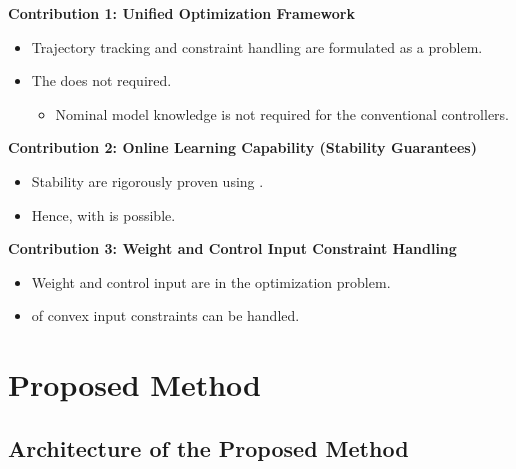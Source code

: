 \documentclass[8pt, aspectratio=169]{beamer}
\newcommand{\ctxt}[2]{\color{#1}{#2}\color{black} }
\begin{document}
\begin{frame}{\insertsubsectionhead}

  \textbf{Contribution 1: Unified Optimization Framework} 
  {
    \begin{itemize}
      \item Trajectory tracking and constraint handling are formulated as a \ctxt{airforceblue}{unified constrained optimization } problem.
      \item The \ctxt{awesome}{conventional controllers } does not required.
      \begin{itemize}
        \item Nominal model knowledge is not required for the conventional controllers.
      \end{itemize}
    \end{itemize}
  }

  \textbf{Contribution 2: Online Learning Capability (Stability Guarantees)}
  {
    \begin{itemize}
      \item Stability are rigorously proven using \ctxt{airforceblue}{Lyapunov stability theory}.
      \item Hence, \ctxt{airforceblue}{online learning} with \ctxt{awesome}{no prior system knowledge } is possible.
    \end{itemize}
  }

  \textbf{Contribution 3: Weight and Control Input Constraint Handling}
  {
    \begin{itemize}
      \item Weight and control input \ctxt{awesome}{constraints } are \ctxt{airforceblue}{explicitly considered } in the optimization problem.
      \item \ctxt{airforceblue}{Any combination } of convex input constraints can be handled.
    \end{itemize}
  }

\end{frame}

\section{Proposed Method}

\subsection{Architecture of the Proposed Method}
\end{document}
